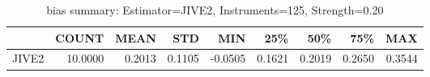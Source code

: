 \begin{table}[ht]
\centering
\caption{bias summary: Estimator=JIVE2, Instruments=125, Strength=0.20}
\begin{tabular}{lrrrrrrrr}
\toprule
 & COUNT & MEAN & STD & MIN & 25\% & 50\% & 75\% & MAX \\
\midrule
JIVE2 & 10.0000 & 0.2013 & 0.1105 & -0.0505 & 0.1621 & 0.2019 & 0.2650 & 0.3544 \\
\bottomrule
\end{tabular}
\end{table}
